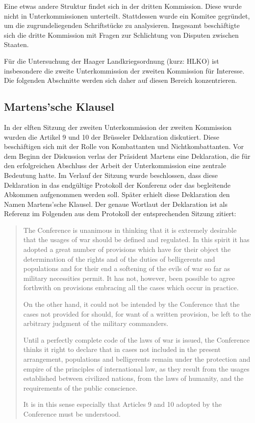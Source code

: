 \documentclass[12pt]{scrartcl}
\begin{document}
Eine etwas andere Struktur findet sich in der dritten Kommission. Diese wurde nicht in Unterkommissionen unterteilt. Stattdessen wurde ein Komitee gegründet, um die zugrundeliegenden Schriftstücke zu analysieren. Insgesamt beschäftigte sich die dritte Kommission mit Fragen zur Schlichtung von Disputen zwischen Staaten.\cite{Scott1920}

Für die Untersuchung der Haager Landkriegsordnung (kurz: HLKO) ist insbesondere die zweite Unterkommission der zweiten Kommission für Interesse. Die folgenden Abschnitte werden sich daher auf diesen Bereich konzentrieren.

\subsection{Martens'sche Klausel}

In der elften Sitzung der zweiten Unterkommission der zweiten Kommission wurden die Artikel 9 und 10 der Brüsseler Deklaration diskutiert. Diese beschäftigen sich mit der Rolle von Kombattanten und Nichtkombattanten. Vor dem Beginn der Diskussion verlas der Präsident Martens eine Deklaration, die für den erfolgreichen Abschluss der Arbeit der Unterkommission eine zentrale Bedeutung hatte. Im Verlauf der Sitzung wurde beschlossen, dass diese Deklaration in das endgültige Protokoll der Konferenz oder das begleitende Abkommen aufgenommen werden soll. Später erhielt diese Deklaration den Namen Martens'sche Klausel. Der genaue Wortlaut der Deklaration ist als Referenz 
im Folgenden aus dem Protokoll der entsprechenden Sitzung\cite{Scott1920} zitiert:

\begin{quotation}
	The Conference is unanimous in thinking that it is extremely desirable that
the usages of war should be defined and regulated. In this spirit it has adopted
a great number of provisions which have for their object the determination of the 
rights and of the duties of belligerents and populations and for their end
a softening of the evils of war so far as military necessities permit. It has not,
however, been possible to agree forthwith on provisions embracing all the cases
which occur in practice.

On the other hand, it could not be intended by the Conference that the
cases not provided for should, for want of a written provision, be left to the
arbitrary judgment of the military commanders.

Until a perfectly complete code of the laws of war is issued, the Conference
thinks it right to declare that in cases not included in the present arrangement,
populations and belligerents remain under the protection and empire of the
principles of international law, as they result from the usages established 
between civilized nations, from the laws of humanity, and the requirements of the
public conscience.

It is in this sense especially that Articles 9 and 10 adopted by the Conference
must be understood.
\end{quotation}
\end{document}
